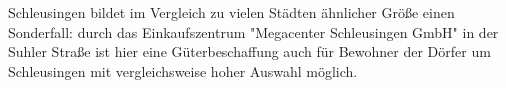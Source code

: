  
Schleusingen bildet im Vergleich zu vielen Städten ähnlicher Größe einen Sonderfall: durch das Einkaufszentrum "Megacenter Schleusingen GmbH" in der Suhler Straße ist hier eine Güterbeschaffung auch für Bewohner der Dörfer um Schleusingen mit vergleichsweise hoher Auswahl möglich.
